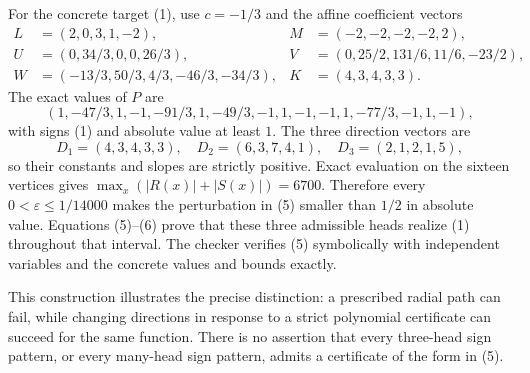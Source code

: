\documentclass[11pt]{article}
\begin{document}
For the concrete target (1), use $c=-1/3$ and the affine coefficient
vectors
\[
 \begin{aligned}
 L&=(2,0,3,1,-2),&M&=(-2,-2,-2,-2,2),\\
 U&=(0,34/3,0,0,26/3),&
 V&=(0,25/2,131/6,11/6,-23/2),\\
 W&=(-13/3,50/3,4/3,-46/3,-34/3),&K&=(4,3,4,3,3).
 \end{aligned}
\]
The exact values of $P$ are
\[
 (1,-47/3,1,-1,-91/3,1,-49/3,-1,
   1,-1,-1,1,-77/3,-1,1,-1),                           \tag{6}
\]
with signs (1) and absolute value at least $1$. The three direction
vectors are
\[
 D_1=(4,3,4,3,3),\quad D_2=(6,3,7,4,1),\quad
 D_3=(2,1,2,1,5),
\]
so their constants and slopes are strictly positive. Exact evaluation
on the sixteen vertices gives
$\max_x(|R(x)|+|S(x)|)=6700$. Therefore every
$0<\varepsilon\leq1/14000$ makes the perturbation in (5) smaller than
$1/2$ in absolute value. Equations (5)--(6) prove that these three
admissible heads realize (1) throughout that interval. The checker
verifies (5) symbolically with independent variables and the concrete
values and bounds exactly.

This construction illustrates the precise distinction: a prescribed
radial path can fail, while changing directions in response to a
strict polynomial certificate can succeed for the same function.
There is no assertion that every three-head sign pattern, or every
many-head sign pattern, admits a certificate of the form in (5).
\end{document}
